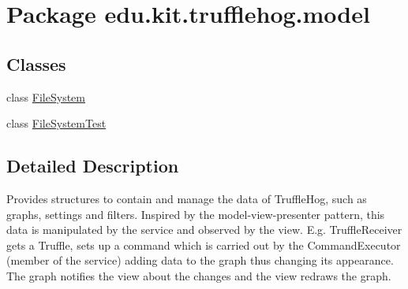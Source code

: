 \hypertarget{namespaceedu_1_1kit_1_1trufflehog_1_1model}{}\section{Package edu.\+kit.\+trufflehog.\+model}
\label{namespaceedu_1_1kit_1_1trufflehog_1_1model}
\subsection*{Classes}
\begin{DoxyCompactItemize}
\item 
class \hyperlink{classedu_1_1kit_1_1trufflehog_1_1model_1_1_file_system}{File\+System}
\item 
class \hyperlink{classedu_1_1kit_1_1trufflehog_1_1model_1_1_file_system_test}{File\+System\+Test}
\end{DoxyCompactItemize}


\subsection{Detailed Description}
Provides structures to contain and manage the data of Truffle\+Hog, such as graphs, settings and filters. Inspired by the model-\/view-\/presenter pattern, this data is manipulated by the service and observed by the view. E.\+g. Truffle\+Receiver gets a Truffle, sets up a command which is carried out by the Command\+Executor (member of the service) adding data to the graph thus changing its appearance. The graph notifies the view about the changes and the view redraws the graph. 